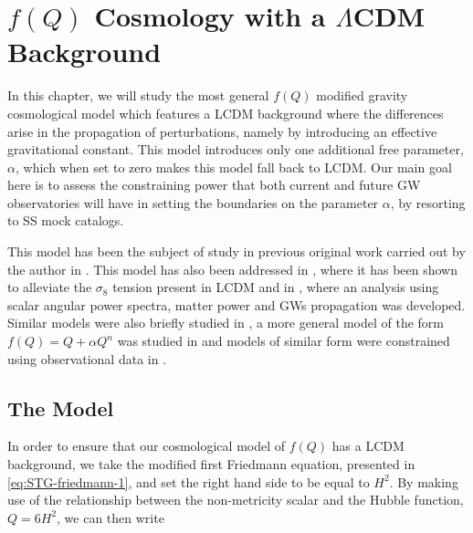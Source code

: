 \chapter{$f(Q)$ Cosmology with a $\Lambda$CDM Background}
\label{chap:STG-LCDM-bg}

In this chapter, we will study the most general $f(Q)$ modified gravity cosmological model which features a \gls{LCDM} background where the differences arise in the propagation of perturbations,
namely by introducing an effective gravitational constant. This model introduces only one additional free parameter, $\alpha$, which when set to zero makes this model fall back to \gls{LCDM}. Our main goal here is to assess the constraining power that both current and future \gls{GW} observatories will have in setting the boundaries on the parameter $\alpha$, by resorting to \gls{SS} mock catalogs.

This model has been the subject of study in previous original work carried out by the author in \cite{Ferreira2022}. This model has also been addressed in \cite{Barros2020}, where it has been shown to alleviate the $\sigma_8$ tension present in \gls{LCDM} and in \cite{Frusciante2021}, where an analysis using scalar angular power spectra, matter power and \glspl{GW} propagation was developed. Similar models were also briefly studied in \cite{Jimenez2017}, a more general model of the form $f(Q) = Q + \alpha Q^n$ was studied in \cite{Khyllep2021} and models of similar form were constrained using observational data in \cite{Ayuso2020, Atayde2021}.


\section{The Model}
\label{sec:STG-LCDM-bg-model}

In order to ensure that our cosmological model of $f(Q)$ has a \gls{LCDM} background, we take the modified first Friedmann equation, presented in \cref{eq:STG-friedmann-1}, and set the right hand side to be equal to $H^2$. By making use of the relationship between the non-metricity scalar and the Hubble function, $Q = 6H^2$, we can then write

